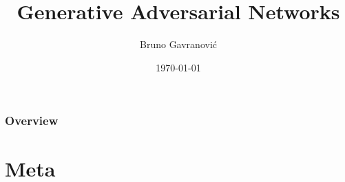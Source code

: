\documentclass{Bredelebeamer}
\title[GAN]{Generative Adversarial Networks} %
\author{Bruno Gavranović} %
\institute[PSIML2017] %
{
Petnica Summer School of Machine Learning\\ %
\medskip
\textit{bruno.gavranovic@fer.hr} %
}
\date{\today} %
\begin{document}
\begin{frame}
\titlepage %
\end{frame}

\begin{frame}
\frametitle{Overview} %
\tableofcontents %
\end{frame}


\section{Meta} %
\end{document}
